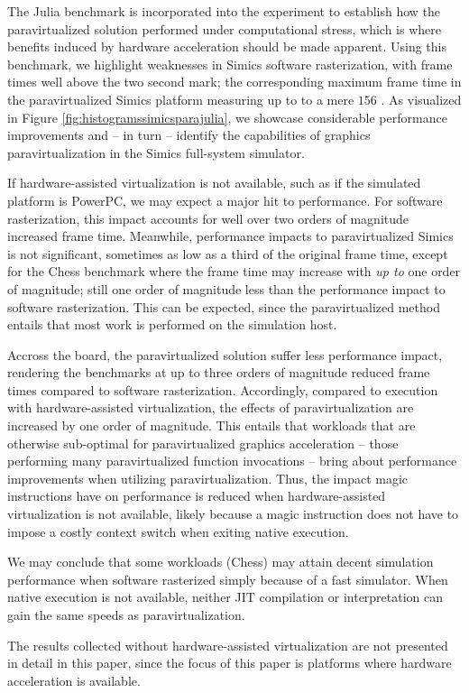 The Julia benchmark is incorporated into the experiment to establish how the paravirtualized solution performed under computational stress, which is where benefits induced by hardware acceleration should be made apparent.
Using this benchmark, we highlight weaknesses in Simics software rasterization, with frame times well above the two second mark; the corresponding maximum frame time in the paravirtualized Simics platform measuring up to to a mere $156$ \milli\second .
As visualized in Figure \ref{fig:histogramssimicsparajulia}, we showcase considerable performance improvements and -- in turn -- identify the capabilities of graphics paravirtualization in the Simics full-system simulator.

If hardware-assisted virtualization is not available, such as if the simulated platform is PowerPC, we may expect a major hit to performance.
For software rasterization, this impact accounts for well over two orders of magnitude increased frame time.
Meanwhile, performance impacts to paravirtualized Simics is not significant, sometimes as low as a third of the original frame time, except for the Chess benchmark where the frame time may increase with \textit{up to} one order of magnitude; still one order of magnitude less than the performance impact to software rasterization.
This can be expected, since the paravirtualized method entails that most work is performed on the simulation host.

Accross the board, the paravirtualized solution suffer less performance impact, rendering the benchmarks at up to three orders of magnitude reduced frame times compared to software rasterization.
Accordingly, compared to execution with hardware-assisted virtualization, the effects of paravirtualization are increased by one order of magnitude.
This entails that workloads that are otherwise sub-optimal for paravirtualized graphics acceleration -- those performing many paravirtualized function invocations -- bring about performance improvements when utilizing paravirtualization.
Thus, the impact magic instructions have on performance is reduced when hardware-assisted virtualization is not available, likely because a magic instruction does not have to impose a costly context switch when exiting native execution.

We may conclude that some workloads (Chess) may attain decent simulation performance when software rasterized simply because of a fast simulator.
When native execution is not available, neither JIT compilation or interpretation can gain the same speeds as paravirtualization.

The results collected without hardware-assisted virtualization are not presented in detail in this paper, since the focus of this paper is platforms where hardware acceleration is available.
